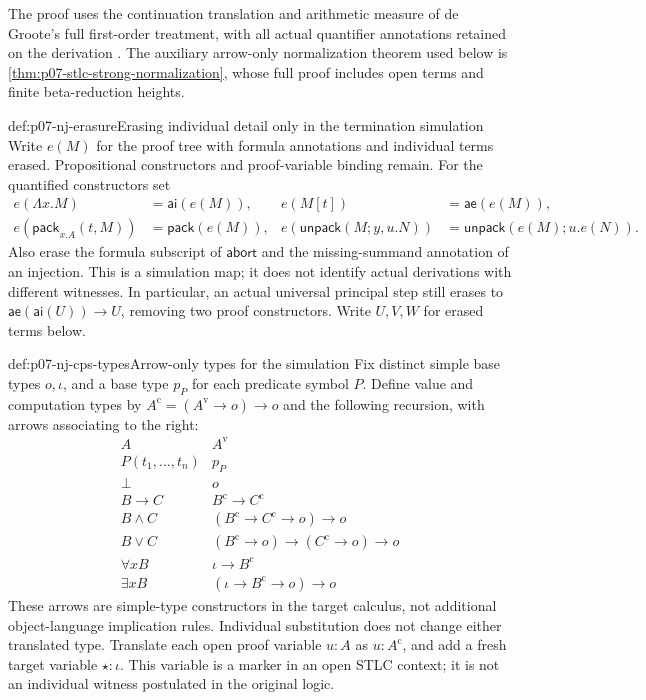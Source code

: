 The proof uses the continuation translation and arithmetic measure
of de Groote's full first-order treatment, with all actual
quantifier annotations retained on the derivation
\cite[Definitions~3, 6--10, 13--16, 19--20]{DeGroote2002NJPermutation}.
The auxiliary arrow-only normalization theorem used below is
\cref{thm:p07-stlc-strong-normalization}, whose full proof includes
open terms and finite beta-reduction heights.

\begin{hbdefinition}{def:p07-nj-erasure}{Erasing individual detail only in the termination simulation}
Write \(e(M)\) for the proof tree with formula annotations and
individual terms erased. Propositional constructors and proof-variable
binding remain. For the quantified constructors set
\[
\begin{aligned}
e(\Lambda x.M)&=\mathsf{ai}(e(M)),&
e(M[t])&=\mathsf{ae}(e(M)),\\
e(\mathsf{pack}_{x.A}(t,M))&=\mathsf{pack}(e(M)),&
e(\mathsf{unpack}(M;y,u.N))&=
        \mathsf{unpack}(e(M);u.e(N)).
\end{aligned}
\]
Also erase the formula subscript of \(\mathsf{abort}\) and the
missing-summand annotation of an injection. This is a simulation
map; it does not identify actual derivations with different witnesses.
In particular, an actual universal principal step still erases
to \(\mathsf{ae}(\mathsf{ai}(U))\to U\), removing two proof
constructors. Write \(U,V,W\) for erased terms below.
\end{hbdefinition}

\begin{hbdefinition}{def:p07-nj-cps-types}{Arrow-only types for the simulation}
Fix distinct simple base types \(o,\iota\), and a base type
\(p_P\) for each predicate symbol \(P\). Define value and
computation types by \(A^{\mathrm c}=(A^{\mathrm v}\to o)\to o\)
and the following recursion, with arrows associating to the right:
\[
\begin{array}{c|l}
A&A^{\mathrm v}\\ \hline
P(t_1,\ldots,t_n)&p_P\\
\bot&o\\
B\to C&B^{\mathrm c}\to C^{\mathrm c}\\
B\land C&(B^{\mathrm c}\to C^{\mathrm c}\to o)\to o\\
B\lor C&(B^{\mathrm c}\to o)\to(C^{\mathrm c}\to o)\to o\\
\forall x B&\iota\to B^{\mathrm c}\\
\exists x B&(\iota\to B^{\mathrm c}\to o)\to o
\end{array}
\]
These arrows are simple-type constructors in the target calculus,
not additional object-language implication rules. Individual
substitution does not change either translated type. Translate
each open proof variable \(u:A\) as \(u:A^{\mathrm c}\), and
add a fresh target variable \(\star:\iota\). This variable
is a marker in an open STLC context; it is not an individual
witness postulated in the original logic.
\end{hbdefinition}

